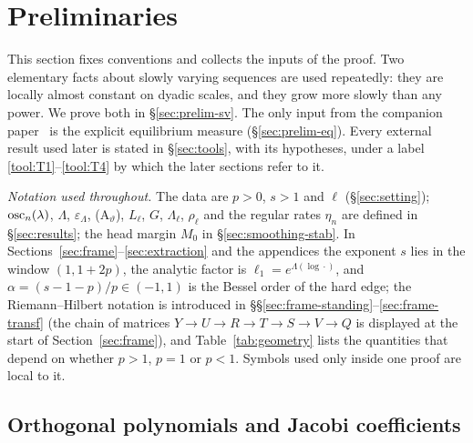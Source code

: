 \makeatletter
\providecommand{\settoollabel}[2]{{\def\@currentlabel{#1}\phantomsection\label{#2}}}
\makeatother
\providecommand{\Cauchy}{\mathcal{C}}
\providecommand{\dC}{\partial\mathcal{C}}
\providecommand{\Res}{\operatorname*{Res}}
\providecommand{\Ath}[1]{\textup{(A$_{#1}$)}}

\section{Preliminaries}\label{sec:prelim}

This section fixes conventions and collects the inputs of the proof. Two elementary facts about slowly varying
sequences are used repeatedly: they are locally almost constant on dyadic scales, and they grow more slowly than any
power. We prove both in \S\ref{sec:prelim-sv}. The only input from the companion paper~\cite{Paper1} is the explicit
equilibrium measure (\S\ref{sec:prelim-eq}). Every external result used later is stated in \S\ref{sec:tools}, with its
hypotheses, under a label \ref{tool:T1}--\ref{tool:T4} by which the later sections refer to it.

\emph{Notation used throughout.} The data are $p>0$, $s>1$ and $\ell$ (\S\ref{sec:setting}); $\operatorname{osc}_n(\lambda)$,
$\Lambda$, $\varepsilon_\Lambda$, \Ath{\vartheta}, $L_\ell$, $G$, $\Lambda_\ell$, $\rho_\ell$ and the
regular rates $\eta_n$ are defined in \S\ref{sec:results}; the head margin $M_0$ in \S\ref{sec:smoothing-stab}. In
Sections~\ref{sec:frame}--\ref{sec:extraction} and the appendices the exponent $s$ lies in the window $(1,1+2p)$, the
analytic factor is $\ell_1=e^{\Lambda(\log\cdot)}$, and $\alpha=(s-1-p)/p\in(-1,1)$ is the Bessel order of the hard edge;
the Riemann--Hilbert notation is introduced in \S\S\ref{sec:frame-standing}--\ref{sec:frame-transf} (the chain of
matrices $Y\to U\to R\to T\to S\to V\to Q$ is displayed at the start of Section~\ref{sec:frame}), and
Table~\ref{tab:geometry} lists the quantities that depend on whether $p>1$, $p=1$ or $p<1$. Symbols used only inside
one proof are local to it.

\subsection{Orthogonal polynomials and Jacobi coefficients}\label{sec:prelim-op}

